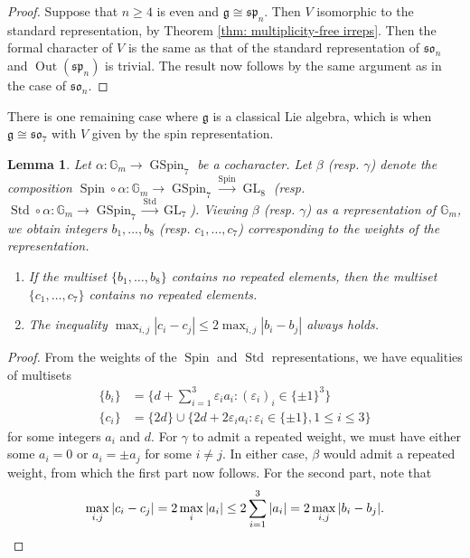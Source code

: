 \documentclass{amsart}
\newtheorem{lemma}[theorem]{Lemma}
\theoremstyle{definition}
\numberwithin{equation}{section} %
\newcommand{\GL}{\operatorname{GL}}
\newcommand{\GSpin}{\operatorname{GSpin}}
\newcommand{\splie}{\mathfrak{sp}}
\newcommand{\solie}{\mathfrak{so}}
\newcommand{\Out}{\operatorname{Out}}
\newcommand{\Std}{\operatorname{Std}}
\newcommand{\Spin}{\operatorname{Spin}}
\newcommand{\eps}{\varepsilon}
\newcommand{\mf}[1]{\mathfrak{#1}}
\begin{document}
\begin{proof}
Suppose that $n \geq 4$ is even and $\mf{g} \cong \splie_n$.
Then $V$ isomorphic to the standard representation, by Theorem \ref{thm: multiplicity-free irreps}.
Then the formal character of $V$ is the same as that of the standard representation of $\solie_n$ and $\Out(\splie_n)$ is trivial.
The result now follows by the same argument as in the case of $\solie_n$.    
\end{proof}

There is one remaining case where $\mf{g}$ is a classical Lie algebra, which is when $\mf{g} \cong \solie_7$ with $V$ given by the spin representation. 

\begin{lemma} \label{lemma: gspin regular cocharacter}
Let $\alpha: \mathbb{G}_m \to \GSpin_7$ be a cocharacter.
Let $\beta$ (resp. $\gamma$) denote the composition $\Spin \circ \alpha: \mathbb{G}_m \to \GSpin_7 \xrightarrow{\Spin} \GL_8$ (resp. $\Std \circ \alpha: \mathbb{G}_m \to \GSpin_7 \xrightarrow{\Std} \GL_7$).
Viewing $\beta$ (resp. $\gamma$) as a representation of $\mathbb{G}_m$, we obtain integers $b_1,\ldots,b_8$ (resp. $c_1,\ldots,c_7$) corresponding to the weights of the representation.
\begin{enumerate}
    \item If the multiset $\{b_1,\ldots,b_8\}$ contains no repeated elements, then the multiset $\{c_1,\ldots,c_7\}$ contains no repeated elements.
    \item The inequality $\max_{i,j} |c_i-c_j| \leq 2 \max_{i,j} |b_i-b_j|$ always holds.
\end{enumerate}
\end{lemma}
\begin{proof}
From the weights of the $\Spin$ and $\Std$ representations, we have equalities of multisets 
\begin{align*}
  \{b_i\} &= \{d + \sum_{i=1}^3 \eps_i a_i : (\eps_i)_i \in \{\pm 1\}^3 \} \\
  \{c_i\} &= \{2d \} \cup \{2d + 2\eps_i a_i : \eps_i \in \{\pm 1\}, 1 \leq i \leq 3\}
\end{align*}
for some integers $a_i$ and $d$.
For $\gamma$ to admit a repeated weight, we must have either some $a_i = 0$ or $a_i = \pm a_j$ for some $i \neq j$.
In either case, $\beta$ would admit a repeated weight, from which the first part now follows.
For the second part, note that 
\[
\max_{i,j} |c_i-c_j| = 2 \max_{i}  |a_i| \leq 2 \sum_{i=1}^3 |a_i| = 2 \max_{i,j}  |b_i-b_j|. \qedhere
\]
\end{proof}
\end{document}
